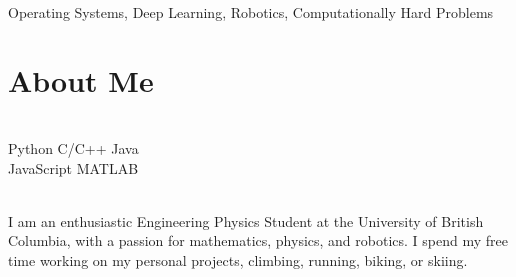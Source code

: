 \documentclass[]{deedy-resume-openfont}
\begin{document}
\begin{adjustwidth}{0.55cm}{1.25cm}
	 \\
	 Operating Systems, Deep Learning, Robotics, Computationally Hard Problems
\end{adjustwidth}

\vspace{10pt}

\section{About Me}
\begin{minipage}[t]{.35\textwidth}
	 \\
	Python \textbullet{} C/C++ \textbullet{} Java \\
	JavaScript \textbullet{} MATLAB
	\vspace{8pt}
\end{minipage}
\hfill
\begin{minipage}[t]{.55\textwidth}
	 \\
	I am an enthusiastic Engineering Physics Student at the University of British Columbia, with a passion for mathematics, physics, and robotics. I spend my free time working on my personal projects, climbing, running, biking, or skiing.
\end{minipage}
\end{document}
